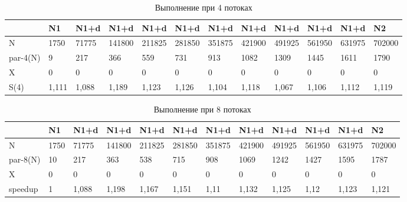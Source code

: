 \documentclass[a4paper,14pt,russian]{extarticle}
\begin{document}
\begin{table}[h]
	\caption{Выполнение при 4 потоках}
	\label{gcc-4}
	\begin{adjustbox}{width=\textwidth,nofloat=table}
		\begin{tabular}{|l|l|l|l|l|l|l|l|l|l|l|l|}
			\hline
			         & N1    & N1+d  & N1+d   & N1+d   & N1+d   & N1+d   & N1+d   & N1+d   & N1+d   & N1+d   & N2     \\ \hline
			N        & 1750  & 71775 & 141800 & 211825 & 281850 & 351875 & 421900 & 491925 & 561950 & 631975 & 702000 \\ \hline
			par-4(N) & 9     & 217   & 366    & 559    & 731    & 913    & 1082   & 1309   & 1445   & 1611   & 1790   \\ \hline
			X        & 0     & 0     & 0      & 0      & 0      & 0      & 0      & 0      & 0      & 0      & 0      \\ \hline
			S(4)  & 1,111 & 1,088 & 1,189  & 1,123  & 1,126  & 1,104  & 1,118  & 1,067  & 1,106  & 1,112  & 1,119  \\ \hline
		\end{tabular}
	\end{adjustbox}
\end{table}

\begin{table}[h]
	\caption{Выполнение при 8 потоках}
	\label{gcc-8}
	\begin{adjustbox}{width=\textwidth,nofloat=table}
		\begin{tabular}{|l|l|l|l|l|l|l|l|l|l|l|l|}
			\hline
	         & N1   & N1+d  & N1+d   & N1+d   & N1+d   & N1+d   & N1+d   & N1+d   & N1+d   & N1+d   & N2     \\ \hline
	N        & 1750 & 71775 & 141800 & 211825 & 281850 & 351875 & 421900 & 491925 & 561950 & 631975 & 702000 \\ \hline
	par-8(N) & 10   & 217   & 363    & 538    & 715    & 908    & 1069   & 1242   & 1427   & 1595   & 1787   \\ \hline
	X        & 0    & 0     & 0      & 0      & 0      & 0      & 0      & 0      & 0      & 0      & 0      \\ \hline
	speedup  & 1    & 1,088 & 1,198  & 1,167  & 1,151  & 1,11   & 1,132  & 1,125  & 1,12   & 1,123  & 1,121  \\ \hline
		\end{tabular}
	\end{adjustbox}
\end{table}
\end{document}
